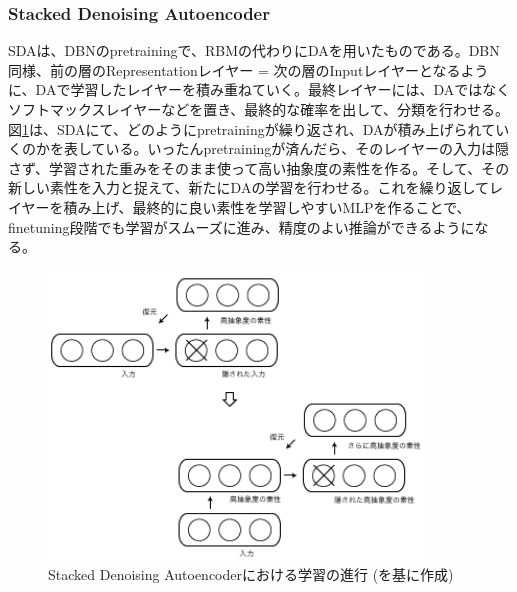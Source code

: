 \subsubsection{Stacked Denoising Autoencoder}
SDAは、DBNのpretrainingで、RBMの代わりにDAを用いたものである。DBN同様、前の層のRepresentationレイヤー = 次の層のInputレイヤーとなるように、DAで学習したレイヤーを積み重ねていく。最終レイヤーには、DAではなくソフトマックスレイヤーなどを置き、最終的な確率を出して、分類を行わせる。図\ref{c3_sda}は、SDAにて、どのようにpretrainingが繰り返され、DAが積み上げられていくのかを表している。いったんpretrainingが済んだら、そのレイヤーの入力は隠さず、学習された重みをそのまま使って高い抽象度の素性を作る。そして、その新しい素性を入力と捉えて、新たにDAの学習を行わせる。これを繰り返してレイヤーを積み上げ、最終的に良い素性を学習しやすいMLPを作ることで、finetuning段階でも学習がスムーズに進み、精度のよい推論ができるようになる。
\begin{figure}[tbp]
 \centering
  \includegraphics[width=100mm]{img/c3/sda}
 \caption{Stacked Denoising Autoencoderにおける学習の進行 (\cite{vincent2008extracting}を基に作成)}
 \label{c3_sda}
\end{figure}


